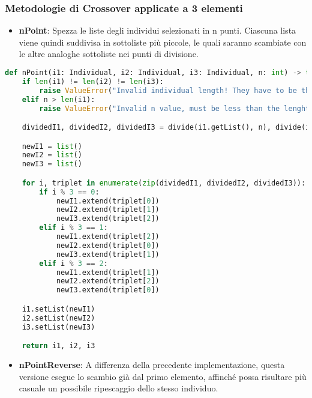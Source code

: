 \documentclass{article}
\begin{document}
\subsubsection {Metodologie di Crossover applicate a 3 elementi}

\begin{itemize}
\item\textbf{nPoint}: Spezza le liste degli individui selezionati in n punti. Ciascuna lista viene quindi suddivisa in sottoliste più piccole, le quali saranno scambiate con le altre analoghe sottoliste nei punti di divisione.
\end{itemize}

\begin{lstlisting}[language=Python]
def nPoint(i1: Individual, i2: Individual, i3: Individual, n: int) -> tuple[Individual, Individual, Individual]:
    if len(i1) != len(i2) != len(i3):
        raise ValueError("Invalid individual length! They have to be the same.")
    elif n > len(i1):
        raise ValueError("Invalid n value, must be less than the lenght of the individual!")

    dividedI1, dividedI2, dividedI3 = divide(i1.getList(), n), divide(i2.getList(), n), divide(i3.getList(), n)

    newI1 = list()
    newI2 = list()
    newI3 = list()

    for i, triplet in enumerate(zip(dividedI1, dividedI2, dividedI3)):
        if i % 3 == 0:
            newI1.extend(triplet[0])
            newI2.extend(triplet[1])
            newI3.extend(triplet[2])
        elif i % 3 == 1:
            newI1.extend(triplet[2])
            newI2.extend(triplet[0])
            newI3.extend(triplet[1])
        elif i % 3 == 2:
            newI1.extend(triplet[1])
            newI2.extend(triplet[2])
            newI3.extend(triplet[0])

    i1.setList(newI1)
    i2.setList(newI2)
    i3.setList(newI3)

    return i1, i2, i3
\end{lstlisting}
\pagebreak

\begin{itemize}
\item\textbf{nPointReverse}: A differenza della precedente implementazione, questa versione esegue lo scambio già dal primo elemento, affinché possa risultare più casuale un possibile ripescaggio dello stesso individuo.
\end{itemize}
\end{document}
